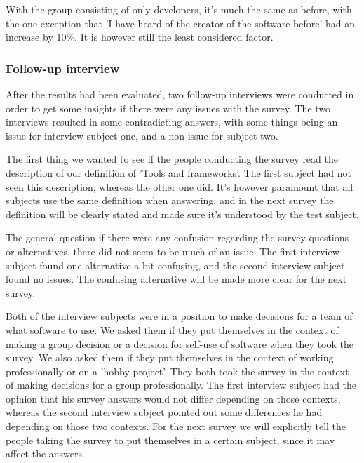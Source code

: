 \documentclass{article}
\begin{document}
With the group consisting of only developers, it's much the same as
before, with the one exception that 'I have heard of the creator of the
software before' had an increase by 10\%. It is however still the least
considered factor.

\subsubsection{Follow-up interview}

After the results had been evaluated, two follow-up interviews were
conducted in order to get some insights if there were any issues with
the survey. The two interviews resulted in some contradicting answers,
with some things being an issue for interview subject one, and a
non-issue for subject two.

The first thing we wanted to see if the people conducting the survey
read the description of our definition of 'Tools and frameworks'. The
first subject had not seen this description, whereas the other one did.
It's however paramount that all subjects use the same definition when
answering, and in the next survey the definition will be clearly stated
and made sure it's understood by the test subject.

The general question if there were any confusion regarding the survey
questions or alternatives, there did not seem to be much of an issue.
The first interview subject found one alternative a bit confusing, and
the second interview subject found no issues. The confusing alternative
will be made more clear for the next survey.

Both of the interview subjects were in a position to make decisions for
a team of what software to use. We asked them if they put themselves in
the context of making a group decision or a decision for self-use of
software when they took the survey. We also asked them if they put
themselves in the context of working professionally or on a 'hobby
project'. They both took the survey in the context of making decisions
for a group professionally. The first interview subject had the opinion
that his survey answers would not differ depending on those contexts,
whereas the second interview subject pointed out some differences he had
depending on those two contexts. For the next survey we will explicitly
tell the people taking the survey to put themselves in a certain
subject, since it may affect the answers.
\end{document}
